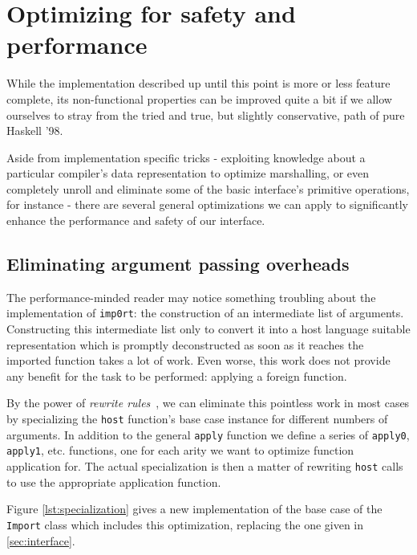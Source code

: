 \documentclass{sigplanconf}
\begin{document}
\section{Optimizing for safety and performance}
\label{sec:optimizations}
While the implementation described up until this point is more or less
feature complete, its non-functional properties can be improved quite a bit
if we allow ourselves to stray from the tried and true, but slightly
conservative, path of pure Haskell '98.

Aside from implementation specific tricks - exploiting knowledge about a
particular compiler's data representation to optimize marshalling, or even
completely unroll and eliminate some of the basic interface's primitive
operations, for instance - there are several general optimizations we can
apply to significantly enhance the performance and safety of our interface.

\subsection{Eliminating argument passing overheads}
\label{sec:specialization}
The performance-minded reader may notice something troubling about the
implementation of \lstinline!imp0rt!: the construction of an intermediate list
of arguments. Constructing this intermediate list only to convert it into a
host language suitable representation which is promptly deconstructed as soon
as it reaches the imported function takes a lot of work. Even worse, this work
does not provide any benefit for the task to be performed: applying a foreign
function.

By the power of \emph{rewrite rules}\ \cite{rewriterules}, we can
eliminate this pointless work in most cases by specializing the
\lstinline!host! function's base case instance for different numbers of
arguments.
In addition to the general \lstinline!apply! function we define a series of
\lstinline!apply0!, \lstinline!apply1!, etc. functions, one for each arity
we want to optimize function application for.
The actual specialization is then a matter of
rewriting \lstinline!host! calls to use the appropriate application function.

Figure \ref{lst:specialization} gives a new implementation of the base case
of the \lstinline!Import! class which includes this optimization, replacing
the one given in \ref{sec:interface}.
\end{document}
